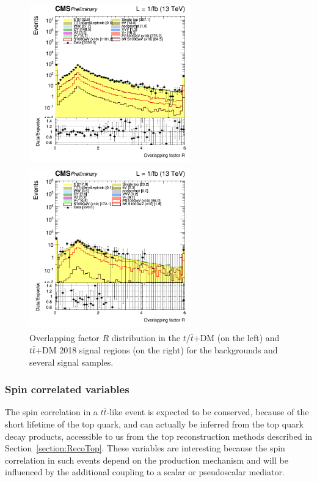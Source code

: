 \documentclass[a4paper, 10pt, openright]{report}
\begin{document}
\begin{figure}[htbp]
\centering
\begin{minipage}[b]{.48\textwidth}
\includegraphics[width=7cm, height=7cm]{figs/log_cratio_topCR_ll_2j_signal1_overlapping_factor.png}
\end{minipage}\hfill
\begin{minipage}[b]{.48\textwidth}
\includegraphics[width=7cm, height=7cm]{figs/log_cratio_topCR_ll_2j_signal0_overlapping_factor.png}
\end{minipage} \hfill
\caption{Overlapping factor $R$ distribution in the $t/ \bar t$+DM (on the left) and $t \bar t$+DM 2018 signal regions (on the right) for the backgrounds and several signal samples.}
\label{fig:SRdisc2}
\end{figure}

\subsubsection*{Spin correlated variables}

The spin correlation in a $t \bar t$-like event is expected to be conserved, because of the short lifetime of the top quark, and can actually be inferred from the top quark decay products, accessible to us from the top reconstruction methods described in Section~\ref{section:RecoTop}. These variables are interesting because the spin correlation in such events depend on the production mechanism and will be influenced by the additional coupling to a scalar or pseudoscalar mediator.
\end{document}
